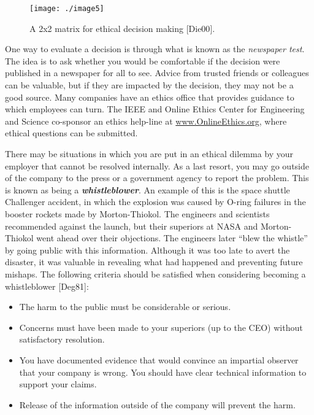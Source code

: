 \begin{figure}[h]
\centering
\texttt{[image: ./image5]}
\caption{A 2x2 matrix for ethical decision making {[}Die00{]}.}
\label{figure:ethics2by2Matrix}
\end{figure}

One way to evaluate a decision is through what is known as the
\emph{newspaper test}. The idea is to ask whether you would be
comfortable if the decision were published in a newspaper for all to
see. Advice from trusted friends or colleagues can be valuable, but if
they are impacted by the decision, they may not be a good source. Many
companies have an ethics office that provides guidance to which
employees can turn. The IEEE and Online Ethics Center for Engineering
and Science co-sponsor an ethics help-line at
\href{http://www.OnlineEthics.org}{www.OnlineEthics.org}, where ethical
questions can be submitted.

There may be situations in which you are put in an ethical dilemma by
your employer that cannot be resolved internally. As a last resort, you
may go outside of the company to the press or a government agency to
report the problem. This is known as being a
\emph{\textbf{whistleblower}}. An example of this is the space shuttle
Challenger accident, in which the explosion was caused by O-ring
failures in the booster rockets made by Morton-Thiokol. The engineers
and scientists recommended against the launch, but their superiors at
NASA and Morton-Thiokol went ahead over their objections. The engineers
later ``blew the whistle'' by going public with this information.
Although it was too late to avert the disaster, it was valuable in
revealing what had happened and preventing future mishaps. The following
criteria should be satisfied when considering becoming a whistleblower
{[}Deg81{]}:

\begin{itemize}
\item
  The harm to the public must be considerable or serious.
\item
  Concerns must have been made to your superiors (up to the CEO) without
  satisfactory resolution.
\item
  You have documented evidence that would convince an impartial observer
  that your company is wrong. You should have clear technical
  information to support your claims.
\item
  Release of the information outside of the company will prevent the
  harm.
\end{itemize}

